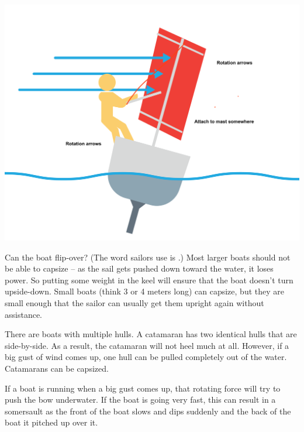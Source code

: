 \includegraphics[width=.75\textwidth]{heeling2.png}


Can the boat flip-over?  (The word sailors use is .)  Most larger boats should not be able to capsize -- as the sail gets pushed down toward the water,  it loses power.  So putting some weight in the keel will ensure that the boat doesn't turn upside-down.  Small boats (think 3 or 4 meters long) can capsize,  but they are small enough that the sailor can usually
get them upright again without assistance.

There are boats with multiple hulls.   A catamaran has two identical hulls that are side-by-side.  As a result,  the catamaran will not heel much at all.  However,  if a big gust of wind comes up, one hull can be pulled completely out of the water.  Catamarans can be capsized.

If a boat is running when a big gust comes up,  that rotating force will try to push the bow underwater.   If the boat is going very fast,  this can result in a somersault as 
the front of the boat slows and dips suddenly and the back of the boat it pitched up over it.



